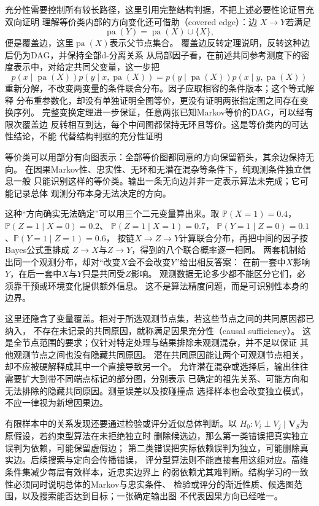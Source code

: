 充分性需要控制所有较长路径，这里引用完整结构判据，不把上述必要性论证冒充
双向证明
理解等价类内部的方向变化还可借助（covered edge）：边
\(X\to Y\)若满足
\[
  \operatorname{pa}(Y)=\operatorname{pa}(X)\cup\{X\},
\]
便是覆盖边，这里\(\operatorname{pa}(X)\)表示父节点集合。
覆盖边反转定理说明，反转这种边后仍为DAG，并保持全部d-分离关系
从局部因子看，在前述共同参考测度下的密度表示中，对给定共同父变量，这一步把
\[
  p(x\mid\operatorname{pa}(X))
  p(y\mid x,\operatorname{pa}(X))
  =
  p(y\mid\operatorname{pa}(X))
  p(x\mid y,\operatorname{pa}(X))
\]
重新分解，不改变两变量的条件联合分布。因子应取相容的条件版本；这个等式解释
分布重参数化，却没有单独证明全图等价，更没有证明两张指定图之间存在变换序列。
完整变换定理进一步保证，任意两张已知Markov等价的DAG，可以经有限次覆盖边
反转相互到达，每个中间图都保持无环且等价。这是等价类内的可达性结论，不能
代替结构判据的充分性证明

等价类可以用部分有向图表示：全部等价图都同意的方向保留箭头，其余边保持无向。
在因果Markov性、忠实性、无环和无潜在混杂等条件下，纯观测条件独立信息一般
只能识别这样的等价类。输出一条无向边并非一定表示算法未完成；它可能记录总体
观测分布本身无法决定的方向。

这种“方向确实无法确定”可以用三个二元变量算出来。取
\(\mathbb P(X=1)=0.4\)，\(\mathbb P(Z=1\mid X=0)=0.2\)、
\(\mathbb P(Z=1\mid X=1)=0.7\)，
\(\mathbb P(Y=1\mid Z=0)=0.1\)、\(\mathbb P(Y=1\mid Z=1)=0.6\)，
按链\(X\to Z\to Y\)计算联合分布，再把中间的因子按Bayes公式重排成
\(Z\to X\)与\(Z\to Y\)，得到的八个联合概率逐一相同。
两套机制给出同一个观测分布，却对“改变\(X\)会不会改变\(Y\)”给出相反答案：
在前一套中\(X\)影响\(Y\)，在后一套中\(X\)与\(Y\)只是共同受\(Z\)影响。
观测数据无论多少都不能区分它们，必须靠干预或环境变化提供额外信息。
这不是算法精度问题，而是可识别性本身的边界。

这里还隐含了变量覆盖。相对于所选观测节点集，若这些节点之间的共同原因都已纳入，
不存在未记录的共同原因，就称满足因果充分性（causal sufficiency）。
这是全节点范围的要求；仅针对特定处理与结果排除未观测混杂，并不足以保证
其他观测节点之间也没有隐藏共同原因。
潜在共同原因能让两个可观测节点相关，却不应被硬解释成其中一个直接导致另一个。
允许潜在混杂或选择后，输出往往需要扩大到带不同端点标记的部分图，分别表示
已确定的祖先关系、可能方向和无法排除的隐藏共同原因。测量误差以及按碰撞点
选择样本也会改变独立模式，不应一律视为新增因果边。

有限样本中的关系发现还要通过检验或评分近似总体判断。以
\(H_0:V_i\perp V_j\mid\bm V_S\)为原假设，若约束型算法在未拒绝独立时
删除候选边，那么第一类错误把真实独立误判为依赖，可能保留虚假边；
第二类错误把实际依赖误判为独立，可能删除真实边。后续搜索与定向会传播错误，
评分型算法则不能直接套用这组对应。高维条件集减少每层有效样本，近忠实边界上
的弱依赖尤其难判断。结构学习的一致性必须同时说明总体的Markov与忠实条件、
检验或评分的渐近性质、候选图范围，以及搜索能否达到目标；一张确定输出图
不代表因果方向已经唯一。

